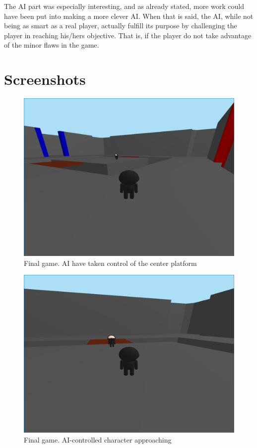 \documentclass[12pt,a4paper,titlepage]{article}
\begin{document}
The AI part was especially interesting, and as
already stated, more work could have been put into making a more clever AI.
When that is said, the AI, while not being as smart as a real player,
actually fulfill its purpose by challenging the player in reaching his/hers
objective. That is, if the player do not take advantage of the minor flaws in
the game.


\newpage
\section{Screenshots}
\label{sec-4}
\begin{figure}[h]
      \centering
      \includegraphics[width=\textwidth]{screen1.png}
      \caption{Final game. AI have taken control of the center platform}
\end{figure}

\begin{figure}[h]
      \centering
      \includegraphics[width=\textwidth]{screen2.png}
      \caption{Final game. AI-controlled character approaching}
\end{figure}
\end{document}
